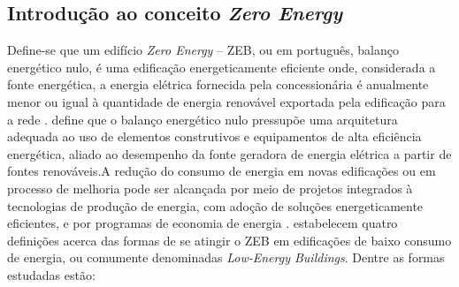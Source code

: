 \subsection{Introdução ao conceito \textit{Zero Energy}}
Define-se que um edifício \textit{Zero Energy} – ZEB, ou em português, balanço 
energético nulo, é uma edificação  energeticamente  eficiente  onde,  
considerada  a  fonte  energética,  a  energia  elétrica fornecida pela 
concessionária é anualmente menor ou igual à quantidade de energia renovável 
exportada pela edificação para a rede 
\cite{Torcellini2006,U.S.DepartmentofEnergy-USDOE2012,U.S.DepartmentofEnergy-USDOE2015}.\newline 
\textcite{Domingos2014} define  que  o  balanço  energético  nulo  pressupõe  
uma  arquitetura adequada ao uso de elementos construtivos e equipamentos 
de alta eficiência energética, aliado ao desempenho da fonte geradora de 
energia elétrica a partir de fontes renováveis.\newline A redução do consumo de 
energia em novas edificações ou em processo de melhoria pode ser alcançada 
por meio de projetos integrados à tecnologias de produção de energia, com 
adoção de soluções   energeticamente   eficientes,   e   por   programas   
de   economia   de   energia \cite{U.S.DepartmentofEnergy-USDOE2015}.\newline
\textcite{Torcellini2006} estabelecem quatro definições acerca das formas de 
se atingir o ZEB em edificações  de  baixo  consumo  de  energia,  ou  
comumente  denominadas \textit{Low-Energy Buildings}. Dentre as formas estudadas estão: 
